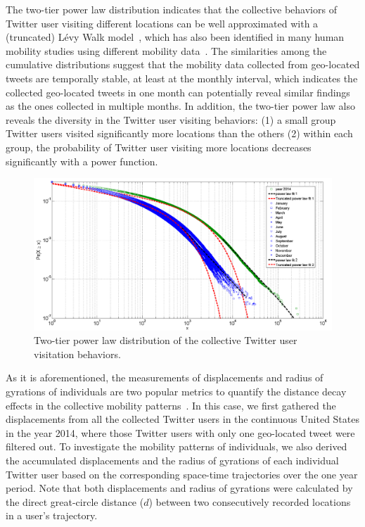 \documentclass[ijgi,article,accept,moreauthors,pdftex,10pt,a4paper]{mdpi}
\theoremstyle{mdpi}
\newcounter{ex}
\newcounter{re}
\theoremstyle{mdpidefinition}
\begin{document}
The two-tier power law distribution indicates that the collective behaviors of Twitter user visiting different locations can be well approximated with a (truncated) L\'{e}vy Walk model~\cite{ reynolds2012truncated, rhee2011levy}, which has also been identified in many human mobility studies using different mobility data~\cite{zhao2015explaining}.
The similarities among the cumulative distributions suggest that the mobility data collected from geo-located tweets are temporally stable, at least at the monthly interval, which indicates the collected geo-located tweets in one month can potentially reveal similar findings as the ones collected in multiple months.
In addition, the two-tier power law also reveals the diversity in the Twitter user visiting behaviors: (1) a small group Twitter users visited significantly more locations than the others (2) within each group, the probability of Twitter user visiting more locations decreases significantly with a power function.

\begin{figure}[ht]
\centering
\includegraphics[width=1.0\linewidth]{./figures/visitation}
\caption{Two-tier power law distribution of the collective Twitter user visitation behaviors.}
\label{fig:visitation}
\end{figure}
\FloatBarrier

As it is aforementioned, the measurements of displacements and radius of gyrations of individuals are two popular metrics to quantify the distance decay effects in the collective mobility patterns~\cite{gonzalez2008understanding}.
In this case, we first gathered the displacements from all the collected Twitter users in the continuous United States in the year 2014, where those Twitter users with only one geo-located tweet were filtered out. 
To investigate the mobility patterns of individuals, we also derived the accumulated displacements and the radius of gyrations of each individual Twitter user based on the corresponding space-time trajectories over the one year period.
Note that both displacements and radius of gyrations were calculated by the direct great-circle distance ($d$) between two consecutively recorded locations in a user's trajectory.
\end{document}
